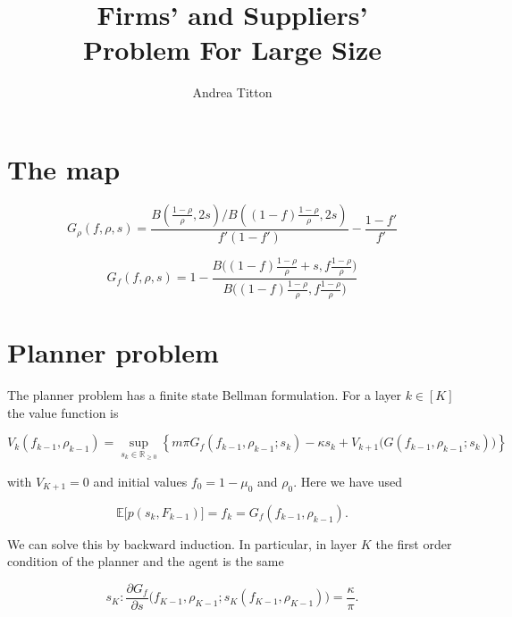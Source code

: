 \documentclass[american, abstract=on]{scrartcl}
\author{Andrea Titton}
\title{Firms' and Suppliers'\\Problem For Large Size}
\theoremstyle{plain}
\renewcommand{\Re}{\mathbb{R}}
\newcommand{\E}{\mathbb{E}}
\begin{document}
\maketitle

\section{The map}

\begin{equation}
    G_{\rho}(f, \rho, s) = \frac{ B\left(\frac{1 - \rho}{\rho}, 2s \right) \Big/ B\left((1 - f) \frac{1 - \rho}{\rho}, 2s \right)}{f' (1 - f')} - \frac{1 - f'}{f'}
\end{equation}

\begin{equation}
    G_f(f, \rho, s) = 1 - \frac{B\Big( (1 - f) \frac{1 - \rho}{\rho} + s, f \frac{1 - \rho}{\rho} \Big)}{B\Big( (1 - f) \frac{1 - \rho}{\rho}, f \frac{1 - \rho}{\rho} \Big)}
\end{equation}


\section{Planner problem}

The planner problem has a finite state Bellman formulation. For a layer $k \in [K]$ the value function is 

\begin{equation}
    V_k(f_{k - 1}, \rho_{k - 1}) = \sup_{s_k \in \Re_{\geq 0}} \left\{ m \pi G_f(f_{k - 1}, \rho_{k-1}; s_k) - \kappa s_k  + V_{k + 1}\Big(G(f_{k - 1}, \rho_{k-1}; s_k)\Big) \right\} 
\end{equation}

with $V_{K + 1} = 0$ and initial values $f_0 = 1 - \mu_0$ and $\rho_0$. Here we have used

\begin{equation}
    \E\Big[ p(s_k, F_{k-1}) \Big] = f_k = G_f(f_{k - 1}, \rho_{k-1}).
\end{equation}

We can solve this by backward induction. In particular, in layer $K$ the first order condition of the planner and the agent is the same 

\begin{equation}
    s_K: \frac{\partial G_f}{\partial s}\Big(f_{K-1}, \rho_{K-1}; s_{K}(f_{K-1}, \rho_{K-1})\Big) = \frac{\kappa}{\pi}.
\end{equation}
\end{document}
